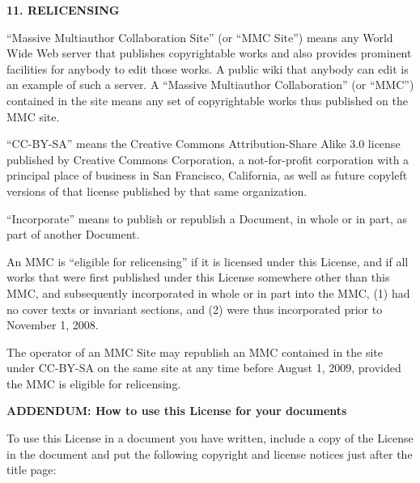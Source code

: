 \begin{scriptsize}
\begin{multicols}{2}
    \begin{center}
      {\bf 11. RELICENSING\par}
    \end{center}


    ``Massive Multiauthor Collaboration Site'' (or ``MMC Site'') means any World Wide Web server that publishes copyrightable works and also provides prominent facilities for anybody to edit those works.  A public wiki that anybody can edit is an example of such a server. A ``Massive Multiauthor Collaboration'' (or ``MMC'') contained in the site means any set of copyrightable works thus published on the MMC site.

    ``CC-BY-SA'' means the Creative Commons Attribution-Share Alike 3.0 license published by Creative Commons Corporation, a not-for-profit corporation with a principal place of business in San Francisco, California, as well as future copyleft versions of that license published by that same organization.

    ``Incorporate'' means to publish or republish a Document, in whole or in part, as part of another Document.

    An MMC is ``eligible for relicensing'' if it is licensed under this License, and if all works that were first published under this License somewhere other than this MMC, and subsequently incorporated in whole or in part into the MMC, (1) had no cover texts or invariant sections, and (2) were thus incorporated prior to November 1, 2008.

    The operator of an MMC Site may republish an MMC contained in the site under CC-BY-SA on the same site at any time before August 1, 2009, provided the MMC is eligible for relicensing.

    \begin{center}
      {\bf ADDENDUM: How to use this License for your documents\par}
    \end{center}
    
    To use this License in a document you have written, include a copy of the License in the document and put the following copyright and license notices just after the title page:

    

\end{multicols}
\end{scriptsize}
